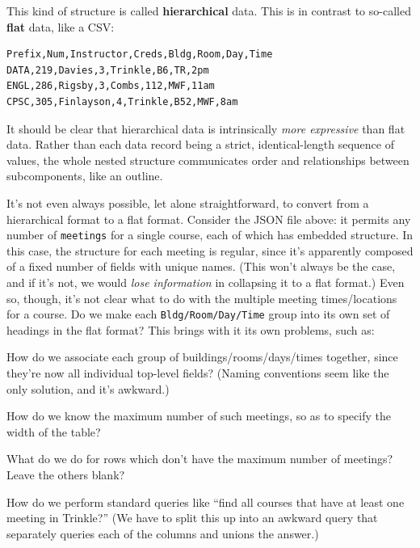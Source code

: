 \normalsize

\pagebreak

This kind of structure is called \textbf{hierarchical} data. This is in
contrast to so-called \textbf{flat} data, like a CSV:

\begin{Verbatim}[fontsize=\small,samepage=true,frame=none]
Prefix,Num,Instructor,Creds,Bldg,Room,Day,Time
DATA,219,Davies,3,Trinkle,B6,TR,2pm
ENGL,286,Rigsby,3,Combs,112,MWF,11am
CPSC,305,Finlayson,4,Trinkle,B52,MWF,8am
\end{Verbatim}

It should be clear that hierarchical data is intrinsically \textit{more
expressive} than flat data. Rather than each data record being a strict,
identical-length sequence of values, the whole nested structure communicates
order and relationships between subcomponents, like an outline.

It's not even always possible, let alone straightforward, to convert from a
hierarchical format to a flat format. Consider the JSON file above: it permits
any number of \texttt{meetings} for a single course, each of which has
embedded structure. In this case, the structure for each meeting is regular,
since it's apparently composed of a fixed number of fields with unique names.
(This won't always be the case, and if it's not, we would \textit{lose
information} in collapsing it to a flat format.) Even so, though, it's not
clear what to do with the multiple meeting times/locations for a course. Do we
make each \texttt{Bldg/Room/Day/Time} group into its own set of headings in
the flat format? This brings with it its own problems, such as:

\begin{compactenum}
\item How do we associate each group of buildings/rooms/days/times together,
since they're now all individual top-level fields? (Naming conventions seem
like the only solution, and it's awkward.)
\item How do we know the maximum number of such meetings, so as to specify the
width of the table?
\item What do we do for rows which don't have the maximum number of meetings?
Leave the others blank?
\item How do we perform standard queries like ``find all courses that have at
least one meeting in Trinkle?'' (We have to split this up into an awkward query
that separately queries each of the columns and unions the answer.)
\end{compactenum}

